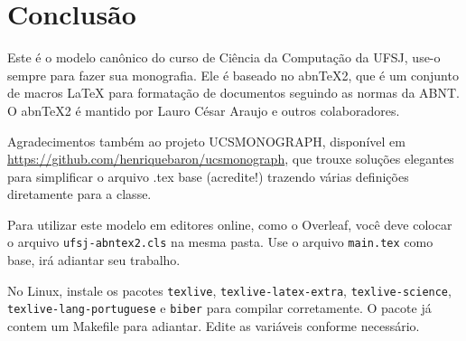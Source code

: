 \chapter[Conclusão]{Conclusão}

Este é o modelo canônico do curso de Ciência da Computação da UFSJ, use-o sempre para fazer sua monografia.
Ele é baseado no abnTeX2, que é um conjunto de macros LaTeX para formatação de documentos seguindo as normas da ABNT.
O abnTeX2 é mantido por Lauro César Araujo e outros colaboradores.

Agradecimentos também ao projeto UCSMONOGRAPH, disponível em \url{https://github.com/henriquebaron/ucsmonograph}, que trouxe soluções elegantes para simplificar o arquivo .tex base (acredite!) trazendo várias definições diretamente para a classe.

Para utilizar este modelo em editores online, como o Overleaf, você deve colocar o arquivo \texttt{ufsj-abntex2.cls} na mesma pasta.
Use o arquivo \texttt{main.tex} como base, irá adiantar seu trabalho.

No Linux, instale os pacotes \texttt{texlive}, \texttt{texlive-latex-extra}, \texttt{texlive-science}, \texttt{texlive-lang-portuguese} e \texttt{biber} para compilar corretamente. O pacote já contem um Makefile para adiantar. Edite as variáveis conforme necessário.